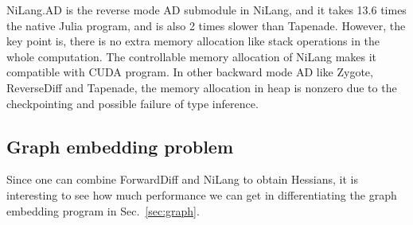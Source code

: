 \documentclass{article}
\newcommand{\<}{\langle}
\renewcommand{\>}{\rangle}
\newcommand{\Sec}[1]{Sec.~\ref{#1}}
\newcommand{\App}[1]{Appendix \ref{#1}}
\theoremstyle{definition}\newtheorem{definition}{\textit{Definition}}
\begin{document}
NiLang.AD is the reverse mode AD submodule in NiLang, and it takes 13.6 times the native Julia program, and is also 2 times slower than Tapenade. However, the key point is, there is no extra memory allocation like stack operations in the whole computation. The controllable memory allocation of NiLang makes it compatible with CUDA program.
In other backward mode AD like Zygote, ReverseDiff and Tapenade, the memory allocation in heap is nonzero due to the checkpointing and possible failure of type inference.

\subsection{Graph embedding problem}
Since one can combine ForwardDiff and NiLang to obtain Hessians,
it is interesting to see how much performance we can get in differentiating the graph embedding program in \Sec{sec:graph}.
\end{document}
